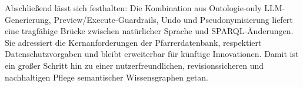 \medskip
\noindent Abschließend lässt sich festhalten: Die Kombination aus Ontologie-only LLM-Generierung, Preview/Execute-Guardrails, Undo und Pseudonymisierung liefert eine tragfähige Brücke zwischen natürlicher Sprache und SPARQL-Änderungen. Sie adressiert die Kernanforderungen der Pfarrerdatenbank, respektiert Datenschutzvorgaben und bleibt erweiterbar für künftige Innovationen. Damit ist ein großer Schritt hin zu einer nutzerfreundlichen, revisionssicheren und nachhaltigen Pflege semantischer Wissensgraphen getan.







